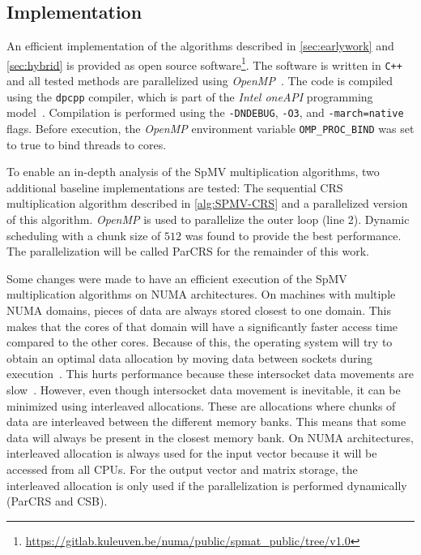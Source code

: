 \documentclass{siamart220329}
\begin{document}
\subsection{Implementation}
An efficient implementation of the algorithms described in \cref{sec:earlywork} and \cref{sec:hybrid} is provided as open source software\footnote{\url{https://gitlab.kuleuven.be/numa/public/spmat_public/tree/v1.0}}. The software is written in \texttt{C++} and all tested methods are parallelized using \textit{OpenMP}~\cite{openmp5}. The code is compiled using the \texttt{dpcpp} compiler, which is part of the \textit{Intel oneAPI} programming model~\cite{oneapi}. Compilation is performed using the \texttt{-DNDEBUG},  \texttt{-O3}, and \texttt{-march=native} flags. Before execution, the \textit{OpenMP} environment variable \texttt{OMP\_PROC\_BIND} was set to true to bind threads to cores.

To enable an in-depth analysis of the SpMV multiplication algorithms, two additional baseline implementations are tested: The sequential CRS multiplication algorithm described in \cref{alg:SPMV-CRS} and a parallelized version of this algorithm. \textit{OpenMP} is used to parallelize the outer loop (line 2). Dynamic scheduling with a chunk size of $512$ was found to provide the best performance. The parallelization will be called ParCRS for the remainder of this work.

Some changes were made to have an efficient execution of the SpMV multiplication algorithms on NUMA architectures. On machines with multiple NUMA domains, pieces of data are always stored closest to one domain. This makes that the cores of that domain will have a significantly faster access time compared to the other cores. Because of this, the operating system will try to obtain an optimal data allocation by moving data between sockets during execution~\cite{DynamicPageMigration}. This hurts performance because these intersocket data movements are slow~\cite{NUMA}. However, even though intersocket data movement is inevitable, it can be minimized using interleaved allocations. These are allocations where chunks of data are interleaved between the different memory banks. This means that some data will always be present in the closest memory bank. On NUMA architectures, interleaved allocation is always used for the input vector because it will be accessed from all CPUs. For the output vector and matrix storage, the interleaved allocation is only used if the parallelization is performed dynamically (ParCRS and CSB).
\end{document}

